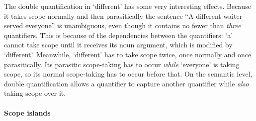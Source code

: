 \documentclass[a4paper]{article}
\begin{document}
The double quantification in `different' has some very interesting
effects. Because it takes scope normally and then parasitically the
sentence ``A different waiter served everyone'' is unambiguous, even
though it contains no fewer than \emph{three} quantifiers. This is
because of the dependencies between the quantifiers: `a' cannot take
scope until it receives its noun argument, which is modified by
`different'. Meanwhile, `different' has to take scope twice, once
normally and once parasitically. Its parasitic scope-taking has to
occur \emph{while} `everyone' is taking scope, so its normal
scope-taking has to occur before that.
On the semantic level, double quantification allows a quantifier to
capture another quantifier while \emph{also} taking scope over it.




\paragraph{Scope islands}










%
%





%
\end{document}
